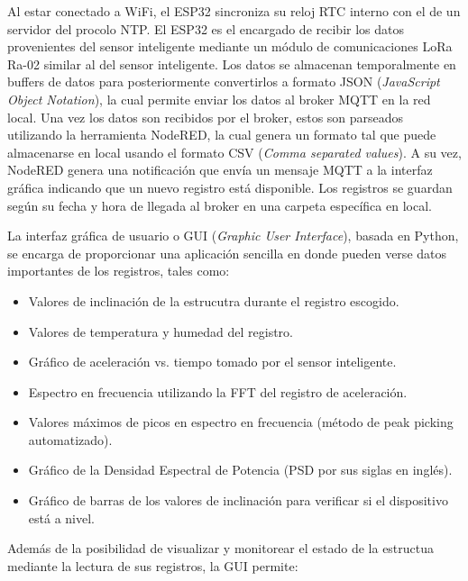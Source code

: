 Al estar conectado a WiFi, el ESP32 sincroniza su reloj RTC interno con el de un servidor del procolo NTP. El ESP32 es el encargado de recibir los datos provenientes del sensor inteligente mediante un módulo de comunicaciones LoRa Ra-02 similar al del sensor inteligente. Los datos se almacenan temporalmente en buffers de datos para posteriormente convertirlos a formato JSON (\textit{JavaScript Object Notation}), la cual permite enviar los datos al broker MQTT en la red local. Una vez los datos son recibidos por el broker, estos son parseados utilizando la herramienta NodeRED, la cual genera un formato tal que puede almacenarse en local usando el formato CSV (\textit{Comma separated values}). A su vez, NodeRED genera una notificación que envía un mensaje MQTT a la interfaz gráfica indicando que un nuevo registro está disponible. Los registros se guardan según su fecha y hora de llegada al broker en una carpeta específica en local.

La interfaz gráfica de usuario o GUI (\textit{Graphic User Interface}), basada en Python, se encarga de proporcionar una aplicación sencilla en donde pueden verse datos importantes de los registros, tales como:

\begin{itemize}
    \item Valores de inclinación de la estrucutra durante el registro escogido.
    \item Valores de temperatura y humedad del registro.
    \item Gráfico de aceleración vs. tiempo tomado por el sensor inteligente.
    \item Espectro en frecuencia utilizando la FFT del registro de aceleración.
    \item Valores máximos de picos en espectro en frecuencia (método de peak picking automatizado).
    \item Gráfico de la Densidad Espectral de Potencia (PSD por sus siglas en inglés).
    \item Gráfico de barras de los valores de inclinación para verificar si el dispositivo está a nivel.
\end{itemize}

Además de la posibilidad de visualizar y monitorear el estado de la estructua mediante la lectura de sus registros, la GUI permite:

